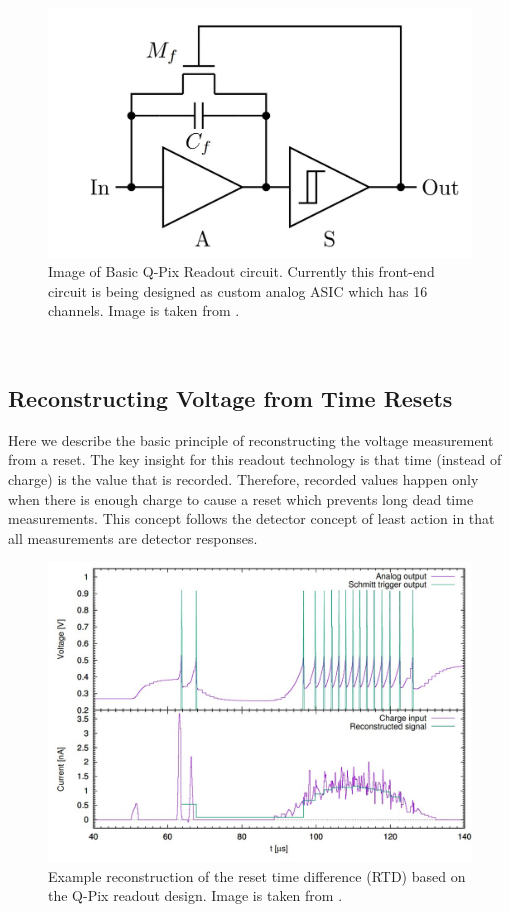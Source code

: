\begin{figure}[]
\centering
\includegraphics[width=\textwidth]{images/qpix_circuit.jpg}
\caption{Image of Basic Q-Pix Readout circuit. Currently this front-end circuit is being designed as custom analog ASIC which has 16 channels. Image is taken from \citep{qpix:nygren:mei}.}
\end{figure}
~\label{fig:qpixCircuit}

\subsection{Reconstructing Voltage from Time Resets}

Here we describe the basic principle of reconstructing the voltage measurement from a reset.
The key insight for this readout technology is that time (instead of charge) is the value that is recorded.
Therefore, recorded values happen only when there is enough charge to cause a reset which prevents long dead time measurements.
This concept follows the detector concept of least action in that all measurements are detector responses.

\begin{figure}[]
\centering
\includegraphics[width=\textwidth]{images/qpix_rtd_reconstruction_example.jpg}
\caption{Example reconstruction of the reset time difference (RTD) based on the Q-Pix readout design. Image is taken from \citep{qpix:nygren:mei}.}
\end{figure}
~\label{fig:qpixRecon1}

